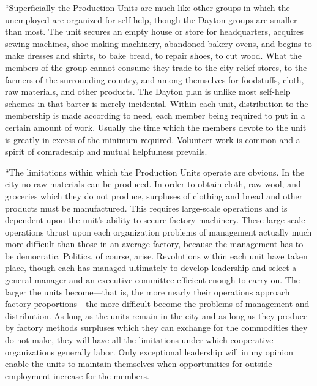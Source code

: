 \documentclass{book}
\begin{document}
“Superficially the Production Units are much like other groups in which the unemployed are organized for self-help, though the Dayton groups are smaller than most. The unit secures an empty house or store for headquarters, acquires sewing machines, shoe-making machinery, abandoned bakery ovens, and begins to make dresses and shirts, to bake bread, to repair shoes, to cut wood. What the members of the group cannot consume they trade to the city relief stores, to the farmers of the surrounding country, and among themselves for foodstuffs, cloth, raw materials, and other products. The Dayton plan is unlike most self-help schemes in that barter is merely incidental. Within each unit, distribution to the membership is made according to need, each member being required to put in a certain amount of work. Usually the time which the members devote to the unit is greatly in excess of the minimum required. Volunteer work is common and a spirit of comradeship and mutual helpfulness prevails.

“The limitations within which the Production Units operate are obvious. In the city no raw materials can be produced. In order to obtain cloth, raw wool, and groceries which they do not produce, surpluses of clothing and bread and other products must be manufactured. This requires large-scale operations and is dependent upon the unit’s ability to secure factory machinery. These large-scale operations thrust upon each organization problems of management actually much more difficult than those in an average factory, because the management has to be democratic. Politics, of course, arise. Revolutions within each unit have taken place, though each has managed ultimately to develop leadership and select a general manager and an executive committee efficient enough to carry on. The larger the units become—that is, the more nearly their operations approach factory proportions—the more difficult become the problems of management and distribution. As long as the units remain in the city and as long as they produce by factory methods surpluses which they can exchange for the commodities they do not make, they will have all the limitations under which cooperative organizations generally labor. Only exceptional leadership will in my opinion enable the units to maintain themselves when opportunities for outside employment increase for the members.
\end{document}
